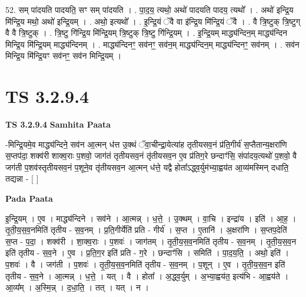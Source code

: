 \documentclass[17pt]{extarticle}
\begin{document}
52. सम् पा॑दयति पादयति॒ सꣳ सम् पा॑दयति । . पा॒द॒य॒ त्यथो॒ अथो॑ पादयति पादय॒ त्यथो᳚ । . अथो॑ इन्द्रि॒य मि॑न्द्रि॒य मथो॒ अथो॑ इन्द्रि॒यम् । . अथो॒ इत्यथो᳚ । . इ॒न्द्रि॒यं ॅवै वा इ॑न्द्रि॒य मि॑न्द्रि॒यं ॅवै । . वै त्रि॒ष्टुक् त्रि॒ष्टुग् वै वै त्रि॒ष्टुक् । . त्रि॒ष्टु गि॑न्द्रि॒य मि॑न्द्रि॒यम् त्रि॒ष्टुक् त्रि॒ष्टु गि॑न्द्रि॒यम् । . इ॒न्द्रि॒यम् माद्ध्य॑न्दिन॒म् माद्ध्य॑न्दिन मिन्द्रि॒य मि॑न्द्रि॒यम् माद्ध्य॑न्दिनम् । . माद्ध्य॑न्दिनꣳ॒॒ सव॑नꣳ॒॒ सव॑न॒म् माद्ध्य॑न्दिन॒म् माद्ध्य॑न्दिनꣳ॒॒ सव॑नम् । . सव॑न मिन्द्रि॒य मि॑न्द्रि॒यꣳ सव॑नꣳ॒॒ सव॑न मिन्द्रि॒यम् । \newline


\section{ TS 3.2.9.4 }

\textbf{TS 3.2.9.4 } \newline
\textbf{Samhita Paata} \newline

-मिन्द्रि॒यमे॒व माद्ध्य॑न्दिने॒ सव॑न आ॒त्मन् ध॑त्त उ॒क्थं ॅवा॒चीन्द्रा॒येत्या॑ह तृतीयसव॒नं प्र॑ति॒गीर्य॑ स॒प्तैतान्य॒क्षरा॑णि स॒प्तप॑दा॒ शक्व॑री शाक्व॒राः प॒शवो॒ जाग॑तं तृतीयसव॒नं तृ॑तीयसव॒न ए॒व प्र॑तिग॒रे छन्दाꣳ॑सि॒ संपा॑दय॒त्यथो॑ प॒शवो॒ वै जग॑ती प॒शव॑स्तृतीयसव॒नं प॒शूने॒व तृ॑तीयसव॒न आ॒त्मन् ध॑त्ते॒ यद्वै होता᳚ऽद्ध्व॒र्युम॑भ्या॒ह्वय॑त आ॒व्य॑मस्मिन् दधाति॒ तद्यन्ना - [  ] \newline

\textbf{Pada Paata} \newline

इ॒न्द्रि॒यम् । ए॒व । माद्ध्य॑न्दिने । सव॑ने । आ॒त्मन्न् । ध॒त्ते॒ । उ॒क्थम् । वा॒चि । इन्द्रा॑य । इति॑ । आ॒ह॒ । तृ॒ती॒य॒स॒व॒नमिति॑ तृतीय - स॒व॒नम् । प्र॒ति॒गीर्येति॑ प्रति - गीर्य॑ । स॒प्त । ए॒तानि॑ । अ॒क्षरा॑णि । स॒प्तप॒देति॑ स॒प्त - प॒दा॒ । शक्व॑री । शा॒क्व॒राः । प॒शवः॑ । जाग॑तम् । तृ॒ती॒य॒स॒व॒नमिति॑ तृतीय - स॒व॒नम् । तृ॒ती॒य॒स॒व॒न इति॑ तृतीय - स॒व॒ने । ए॒व । प्र॒ति॒ग॒र इति॑ प्रति - ग॒रे । छन्दाꣳ॑सि । समिति॑ । पा॒द॒य॒ति॒ । अथो॒ इति॑ । प॒शवः॑ । वै । जग॑ती । प॒शवः॑ । तृ॒ती॒य॒स॒व॒नमिति॑ तृतीय - स॒व॒नम् । प॒शून् । ए॒व । तृ॒ती॒य॒स॒व॒न इति॑ तृतीय - स॒व॒ने । आ॒त्मन्न् । ध॒त्ते॒ । यत् । वै । होता᳚ । अ॒द्ध्व॒र्युम् । अ॒भ्या॒ह्वय॑त॒ इत्य॑भि - आ॒ह्वय॑ते । आ॒व्य᳚म् । अ॒स्मि॒न्न् । द॒धा॒ति॒ । तत् । यत् । न ।  \newline
\end{document}
